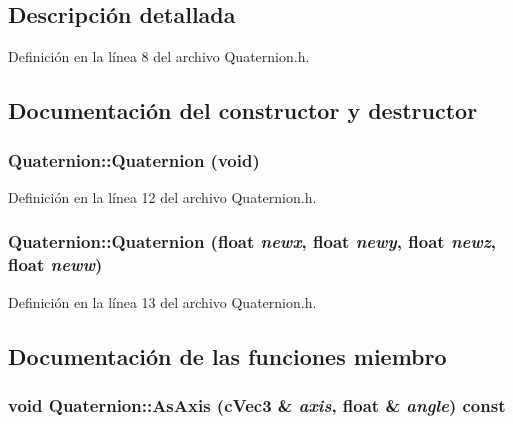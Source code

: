 \subsection{Descripción detallada}


Definición en la línea 8 del archivo Quaternion.h.



\subsection{Documentación del constructor y destructor}
\hypertarget{struct_quaternion_a39a0971895c9e93ae338ed9ecbc18220}{
\subsubsection[{Quaternion}]{\setlength{\rightskip}{0pt plus 5cm}Quaternion::Quaternion (void)}}
\label{struct_quaternion_a39a0971895c9e93ae338ed9ecbc18220}


Definición en la línea 12 del archivo Quaternion.h.

\hypertarget{struct_quaternion_a68fcc1746d03661db1c44a1ef1da0ee4}{
\subsubsection[{Quaternion}]{\setlength{\rightskip}{0pt plus 5cm}Quaternion::Quaternion (float {\em newx}, \/  float {\em newy}, \/  float {\em newz}, \/  float {\em neww})}}
\label{struct_quaternion_a68fcc1746d03661db1c44a1ef1da0ee4}


Definición en la línea 13 del archivo Quaternion.h.



\subsection{Documentación de las funciones miembro}
\hypertarget{struct_quaternion_aeeecfc1222faf1ca6d09a71c38b3de43}{
\subsubsection[{AsAxis}]{\setlength{\rightskip}{0pt plus 5cm}void Quaternion::AsAxis ({\bf cVec3} \& {\em axis}, \/  float \& {\em angle}) const}}
\label{struct_quaternion_aeeecfc1222faf1ca6d09a71c38b3de43}


